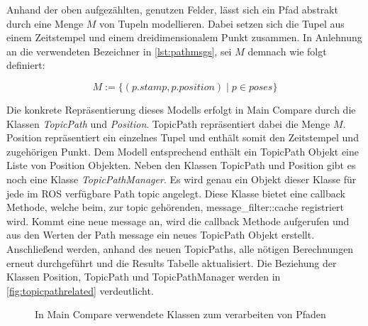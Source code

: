 Anhand der oben aufgezählten, genutzen Felder, lässt sich ein Pfad abstrakt durch eine Menge
$M$ von Tupeln modellieren. Dabei setzen sich die Tupel aus einem Zeitstempel und einem dreidimensionalem
Punkt zusammen. In Anlehnung an die verwendeten Bezeichner in
\autoref{lst:pathmsgs}, sei $M$ demnach wie folgt definiert:

\begin{equation*}
  \label{eqn:setdef}
  M := \{ (p.stamp , p.position) \mid p \in poses \}
\end{equation*}

Die konkrete Repräsentierung dieses Modells erfolgt in Main Compare durch die
Klassen \textit{TopicPath} und \textit{Position}. TopicPath repräsentiert dabei
die Menge $M$. Position repräsentiert ein einzelnes Tupel und enthält somit den
Zeitstempel und zugehörigen Punkt. Dem Modell entsprechend enthält ein
TopicPath Objekt eine Liste von Position Objekten.  Neben den Klassen TopicPath
und Position gibt es noch eine Klasse \textit{TopicPathManager}. Es wird genau
ein Objekt dieser Klasse für jede im ROS verfügbare Path topic angelegt. Diese
Klasse bietet eine callback Methode, welche beim, zur topic gehörenden,
message\_filter::cache registriert wird. Kommt eine neue message an, wird die
callback Methode aufgerufen und aus den Werten der Path message ein neues
TopicPath Objekt erstellt. Anschließend werden, anhand des neuen TopicPaths,
alle nötigen Berechnungen erneut durchgeführt und die Results Tabelle
aktualisiert. Die Beziehung der Klassen Position, TopicPath und
TopicPathManager werden in \autoref{fig:topicpathrelated} verdeutlicht.

\begin{figure}[t]
  \begin{center}
  \end{center}
  \caption{In Main Compare verwendete Klassen zum verarbeiten von Pfaden}
  \label{fig:topicpathrelated}
\end{figure}

